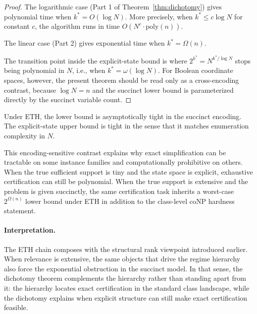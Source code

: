 \begin{proof}
The logarithmic case (Part 1 of Theorem~\ref{thm:dichotomy}) gives polynomial time when $k^* = O(\log N)$. More precisely, when $k^* \leq c \log N$ for constant $c$, the algorithm runs in time $O(N^c \cdot \text{poly}(n))$.

The linear case (Part 2) gives exponential time when $k^* = \Omega(n)$.

The transition point inside the explicit-state bound is where $2^{k^*} = N^{k^*/\log N}$ stops being polynomial in $N$, i.e., when $k^* = \omega(\log N)$. For Boolean coordinate spaces, however, the present theorem should be read only as a cross-encoding contrast, because $\log N = n$ and the succinct lower bound is parameterized directly by the succinct variable count.
\end{proof}

\begin{remark}
Under ETH, the lower bound is asymptotically tight in the succinct encoding. The explicit-state upper bound is tight in the sense that it matches enumeration complexity in $N$.
\end{remark}

This encoding-sensitive contrast explains why exact simplification can be tractable on some instance families and computationally prohibitive on others. When the true sufficient support is tiny and the state space is explicit, exhaustive certification can still be polynomial. When the true support is extensive and the problem is given succinctly, the same certification task inherits a worst-case $2^{\Omega(n)}$ lower bound under ETH in addition to the class-level coNP hardness statement.

\paragraph{Interpretation.} The ETH chain composes with the structural rank viewpoint introduced earlier. When relevance is extensive, the same objects that drive the regime hierarchy also force the exponential obstruction in the succinct model. In that sense, the dichotomy theorem complements the hierarchy rather than standing apart from it: the hierarchy locates exact certification in the standard class landscape, while the dichotomy explains when explicit structure can still make exact certification feasible.

